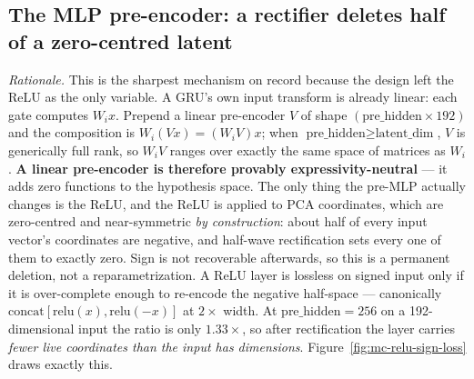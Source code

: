 \documentclass[11pt]{article}
\begin{document}
\subsection{The MLP pre-encoder: a rectifier deletes half of a zero-centred latent}
\label{sec:fail-relu}

\emph{Rationale.} This is the sharpest mechanism on record because the design
left the ReLU as the only variable. A GRU's own input transform is already
linear: each gate computes $W_i x$. Prepend a linear pre-encoder $V$ of shape
$(\text{pre\_hidden}\times192)$ and the composition is
$W_i(Vx)=(W_iV)x$; when $\text{pre\_hidden}\ge\text{latent\_dim}$, $V$ is
generically full rank, so $W_iV$ ranges over exactly the same space of matrices
as $W_i$. \textbf{A linear pre-encoder is therefore provably
expressivity-neutral} --- it adds zero functions to the hypothesis space. The
only thing the pre-MLP actually changes is the ReLU, and the ReLU is applied to
PCA coordinates, which are zero-centred and near-symmetric \emph{by
construction}: about half of every input vector's coordinates are negative, and
half-wave rectification sets every one of them to exactly zero. Sign is not
recoverable afterwards, so this is a permanent deletion, not a
reparametrization. A ReLU layer is lossless on signed input only if it is
over-complete enough to re-encode the negative half-space --- canonically
$\mathrm{concat}[\mathrm{relu}(x),\mathrm{relu}(-x)]$ at $2\times$ width. At
$\text{pre\_hidden}=256$ on a \num{192}-dimensional input the ratio is only
$1.33\times$, so after rectification the layer carries \emph{fewer live
coordinates than the input has dimensions}. Figure~\ref{fig:mc-relu-sign-loss}
draws exactly this.
\end{document}
